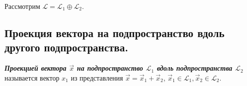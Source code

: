 Рассмотрим $\mathcal{L} = \mathcal{L}_1 \oplus \mathcal{L}_2$.

\subsection{
    Проекция вектора на подпространство вдоль другого подпространства.
}

\begin{definition}
    \textit{\textbf{Проекцией вектора $\vec{x}$ на подпространство $\mathcal{L}_1$ вдоль подпространства $\mathcal{L}_2$}} называется вектор $x_1$ из представления $\vec{x} = \vec{x}_1 + \vec{x}_2$, $\vec{x}_1 \in \mathcal{L}_1, \vec{x}_2 \in \mathcal{L}_2$.
\end{definition}